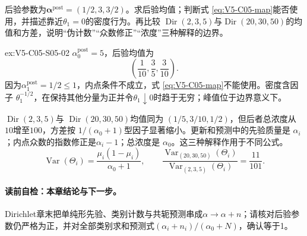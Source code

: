 \begin{SLChapterExercisePairSection}
\begin{exercise}\label{ex:V5-C05-S05-02}
后验参数为$\boldsymbol\alpha^{\mathrm{post}}=(1/2,3,3/2)$。求后验均值；判断式
\eqref{eq:V5-C05-map}能否使用，并描述靠近$\theta_1=0$的密度行为。再比较
$\operatorname{Dir}(2,3,5)$与$\operatorname{Dir}(20,30,50)$的均值和方差，说明“伪计数”“众数修正”“浓度”三种解释的边界。
\end{exercise}
\ifSLFullEdition
{}\label{sol:V5-C05-S05-02}
\begin{chapterexercisesolution}{ex:V5-C05-S05-02}
\nopagebreak[4]
$\alpha_0^{\mathrm{post}}=5$，后验均值为
\[
\left(\frac1{10},\frac35,\frac3{10}\right).
\]
因为$\alpha_1^{\mathrm{post}}=1/2\le1$，内点条件不成立，式
\eqref{eq:V5-C05-map}不能使用。密度含因子
$\theta_1^{-1/2}$，在保持其他分量为正并令$\theta_1\downarrow0$时趋于无穷；峰值位于边界意义下。

$\operatorname{Dir}(2,3,5)$与
$\operatorname{Dir}(20,30,50)$均值同为
$(1/5,3/10,1/2)$，但后者总浓度从$10$增至$100$，方差按
$1/(\alpha_0+1)$型因子显著缩小。更新和预测中的先验质量是
$\alpha_i$；内点众数的指数修正是$\alpha_i-1$；总浓度是
$\alpha_0$。这三种解释作用于不同公式。
\[
\operatorname{Var}(\Theta_i)
=\frac{\mu_i(1-\mu_i)}{\alpha_0+1},\qquad
\frac{\operatorname{Var}_{(20,30,50)}(\Theta_i)}
{\operatorname{Var}_{(2,3,5)}(\Theta_i)}
=\frac{11}{101}.
\]
\end{chapterexercisesolution}
\fi

\end{SLChapterExercisePairSection}
\paragraph{读前自检：本章结论与下一步。}Dirichlet章末把单纯形先验、类别计数与共轭预测串成$\alpha\to\alpha+n$；请核对后验参数仍严格为正，并对全部类别求和预测式$(\alpha_i+n_i)/(\alpha_0+N)$，确认等于1。\par

